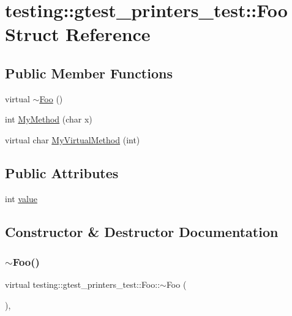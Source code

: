 \hypertarget{structtesting_1_1gtest__printers__test_1_1Foo}{}\section{testing\+::gtest\+\_\+printers\+\_\+test\+::Foo Struct Reference}
\label{structtesting_1_1gtest__printers__test_1_1Foo}
\subsection*{Public Member Functions}
\begin{DoxyCompactItemize}
\item 
virtual \mbox{\hyperlink{structtesting_1_1gtest__printers__test_1_1Foo_a3797cc88591e06b40208ea7535cf33f6}{$\sim$\+Foo}} ()
\item 
int \mbox{\hyperlink{structtesting_1_1gtest__printers__test_1_1Foo_a703c1159114f3a640b16d470a9613672}{My\+Method}} (char x)
\item 
virtual char \mbox{\hyperlink{structtesting_1_1gtest__printers__test_1_1Foo_a368dc5150b27c2aaca6034830334e1cd}{My\+Virtual\+Method}} (int)
\end{DoxyCompactItemize}
\subsection*{Public Attributes}
\begin{DoxyCompactItemize}
\item 
int \mbox{\hyperlink{structtesting_1_1gtest__printers__test_1_1Foo_a8171a69191d34071ea4448d2dda501ec}{value}}
\end{DoxyCompactItemize}


\subsection{Constructor \& Destructor Documentation}
\mbox{\label{structtesting_1_1gtest__printers__test_1_1Foo_a3797cc88591e06b40208ea7535cf33f6}} 
\subsubsection{\texorpdfstring{$\sim$Foo()}{~Foo()}}
{\footnotesize\ttfamily virtual testing\+::gtest\+\_\+printers\+\_\+test\+::\+Foo\+::$\sim$\+Foo (\begin{DoxyParamCaption}{ }\end{DoxyParamCaption})\hspace{0.3cm}{\ttfamily [inline]}, {\ttfamily [virtual]}}



